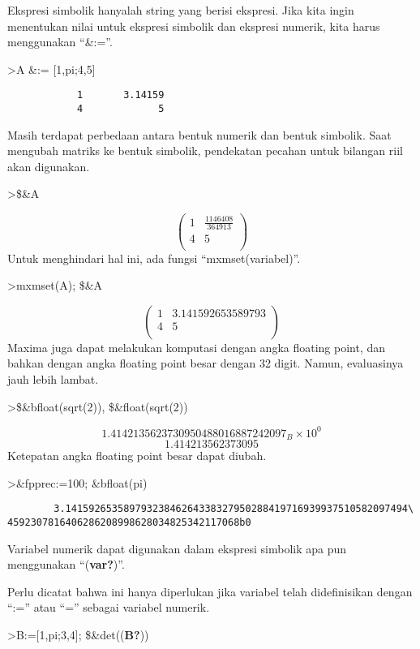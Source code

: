 \documentclass[
]{book}
\begin{document}
Ekspresi simbolik hanyalah string yang berisi ekspresi. Jika kita ingin menentukan nilai untuk ekspresi simbolik dan ekspresi numerik, kita harus menggunakan ``\&:=''.

\textgreater A \&:= {[}1,pi;4,5{]}

\begin{verbatim}
            1       3.14159 
            4             5 
\end{verbatim}

Masih terdapat perbedaan antara bentuk numerik dan bentuk simbolik. Saat mengubah matriks ke bentuk simbolik, pendekatan pecahan untuk bilangan riil akan digunakan.

\textgreater\$\&A

\[\begin{pmatrix}1 & \frac{1146408}{364913} \\ 4 & 5 \\ \end{pmatrix}\]Untuk menghindari hal ini, ada fungsi ``mxmset(variabel)''.

\textgreater mxmset(A); \$\&A

\[\begin{pmatrix}1 & 3.141592653589793 \\ 4 & 5 \\ \end{pmatrix}\]Maxima juga dapat melakukan komputasi dengan angka floating point, dan bahkan dengan angka floating point besar dengan 32 digit. Namun, evaluasinya jauh lebih lambat.

\textgreater\$\&bfloat(sqrt(2)), \$\&float(sqrt(2))

\[1.4142135623730950488016887242097_B \times 10^{0}\] \[1.414213562373095\]Ketepatan angka floating point besar dapat diubah.

\textgreater\&fpprec:=100; \&bfloat(pi)

\begin{verbatim}
        3.14159265358979323846264338327950288419716939937510582097494\
4592307816406286208998628034825342117068b0
\end{verbatim}

Variabel numerik dapat digunakan dalam ekspresi simbolik apa pun menggunakan ``(\textbf{var?})''.

Perlu dicatat bahwa ini hanya diperlukan jika variabel telah didefinisikan dengan ``:='' atau ``='' sebagai variabel numerik.

\textgreater B:={[}1,pi;3,4{]}; \$\&det((\textbf{B?}))
\end{document}
